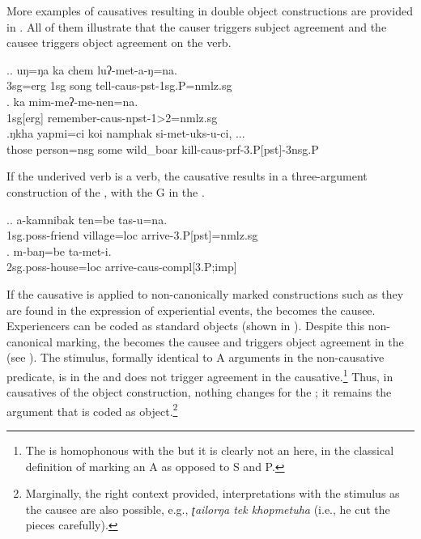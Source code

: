  
\largerpage  
More examples of causatives resulting in double object constructions are provided in \Next. All of them illustrate  that the causer triggers subject agreement and the causee triggers object agreement on the verb. 

\ex.\ag. uŋ=ŋa ka chem luʔ-met-a-ŋ=na.\\
{\sc 3sg=erg} {\sc 1sg} song tell{\sc -caus-pst-1sg.P=nmlz.sg}\\
\bg. ka mim-meʔ-me-nen=na.\\
{\sc 1sg[erg]} remember{\sc -caus-npst-1>2=nmlz.sg} \\
\bg.ŋkha yapmi=ci    koi  namphak   si-met-uks-u-ci, ...\\
those person{\sc =nsg} some wild\_boar kill{\sc -caus-prf-3.P[pst]-3nsg.P}\\

If the underived verb is a  verb, the causative results in a three-argument construction of the , with the G in the  .

\ex.\ag. a-kamnibak ten=be tas-u=na.\\
{\sc 1sg.poss-}friend  village{\sc =loc} arrive{\sc -3.P[pst]=nmlz.sg}\\
\bg. m-baŋ=be  ta-met-i.\\
{\sc 2sg.poss-}house{\sc =loc} arrive{\sc -caus-compl[3.P;imp]}\\

\largerpage 
If the causative is applied to non-canonically marked constructions such as they are found in the expression of experiential events, the   becomes the causee. Experiencers can be coded as standard objects (shown in \Next[a]). Despite this non-canonical marking, the  becomes the causee and triggers object agreement in the  (see \Next[b]). The stimulus, formally identical to A arguments in the non-causative predicate, is in the   and does not trigger agreement in the causative.\footnote{The  is homophonous with the  but it is clearly not an  here, in the classical definition of marking an A as opposed to S and P.} Thus, in causatives of the object  construction, nothing changes for the ; it remains the argument that is coded as object.\footnote{Marginally, the right context provided, interpretations with the stimulus as the causee are also possible, e.g., \emph{ʈailorŋa tek khopmetuha}  (i.e., he cut the pieces carefully).} 

